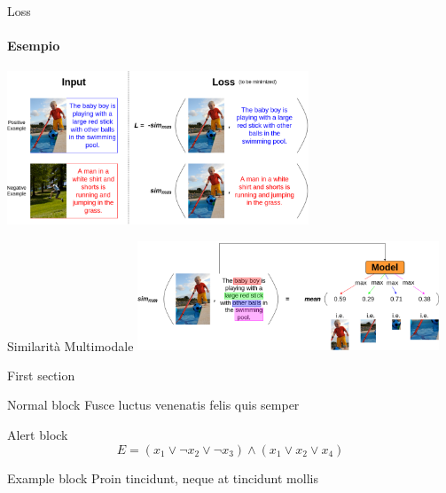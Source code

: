 \documentclass{beamer}
\begin{document}
\begin{frame}{Loss}
  \framesubtitle{Esempio}
  \centering
  \includegraphics[width=9cm]{images/loss.png}
\end{frame}

\begin{frame}{Similarità Multimodale}
  \centering
  \includegraphics[width=9cm]{images/sim-mm.png}
\end{frame}

\begin{frame}{First section}
  \begin{block}{Normal block}
    Fusce luctus venenatis felis quis semper
  \end{block}

  \begin{alertblock}{Alert block}
    $$ E = (x_1 \vee \neg x_2 \vee \neg x_3) \wedge (x_1 \vee x_2 \vee x_4) $$
  \end{alertblock}

  \begin{exampleblock}{Example block}
    Proin tincidunt, neque at tincidunt mollis
  \end{exampleblock}
\end{frame}
\end{document}
